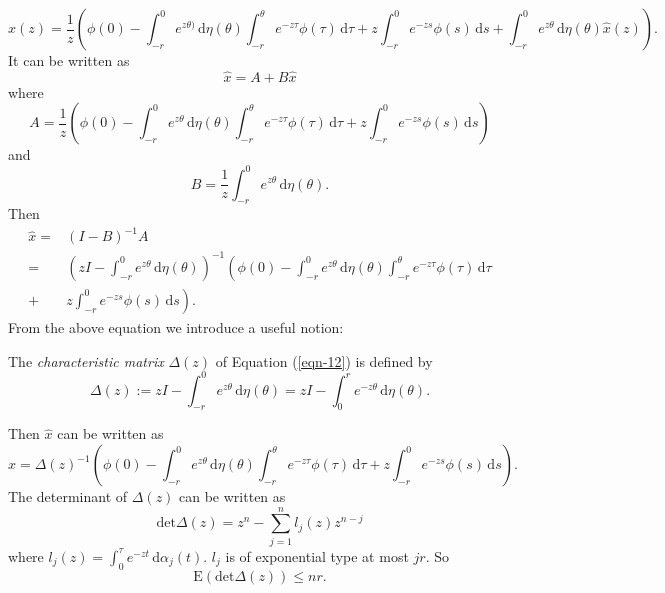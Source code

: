 \begin{equation*}
  \widehat{x}(z)= \frac{1}{z}\left( \phi(0)-\int_{-r}^{0}e^{z\theta)}\,\mathrm{d}\eta(\theta)\int_{-r}^{\theta}e^{-z\tau }\phi(\tau )\,\mathrm{d}\tau +z\int_{-r}^{0}e^{-zs}\phi(s)\,\mathrm{d}s+\int_{-r}^{0}e^{z\theta}\,\mathrm{d}\eta(\theta)\widehat{x}(z) \right) .
\end{equation*}
It can be written as 
\[
\widehat{x}=A+B\widehat{x}
\] 
where
\[
  A=\frac{1}{z}\left( \phi(0)-\int_{-r}^{0}e^{z\theta}\,\mathrm{d}\eta(\theta)\int_{-r}^{\theta}e^{-z\tau }\phi(\tau )\,\mathrm{d}\tau +z\int_{-r}^{0}e^{-zs}\phi(s)\,\mathrm{d}s \right) 
\] 
and
\[
  B=\frac{1}{z}\int_{-r}^{0}e^{z\theta}\,\mathrm{d}\eta(\theta).
\] 
Then
\begin{equation}\label{eqn-17}
 \begin{aligned}
    \widehat{x}= & (I-B)^{-1}A\\
    = & \left(zI-\int_{-r}^{0}e^{z\theta}\,\mathrm{d}\eta(\theta)\right)^{-1} \left( \phi(0)-\int_{-r}^{0}e^{z\theta}\,\mathrm{d}\eta(\theta)\int_{-r}^{\theta}e^{-z\tau }\phi(\tau )\,\mathrm{d}\tau  \right.\\
  + &\left. z\int_{-r}^{0}e^{-zs}\phi(s)\,\mathrm{d}s\right).
  \end{aligned}
\end{equation}
From the above equation we introduce a useful notion:
\begin{definition}
  The \textit{characteristic matrix} $\Delta(z)$ of Equation (\ref{eqn-12}) is defined by
  \begin{equation}
    \Delta(z):=zI-\int_{-r}^{0}e^{z\theta}\,\mathrm{d}\eta(\theta)=zI-\int_0^{r}e^{-z\theta}\,\mathrm{d}\eta(\theta).
  \end{equation}
\end{definition}
Then $\widehat{x}$ can be written as 
\begin{equation}\label{eqn-19}
  \widehat{x}=\Delta(z)^{-1}\left( \phi(0)-\int_{-r}^{0}e^{z\theta}\,\mathrm{d}\eta(\theta)\int_{-r}^{\theta}e^{-z\tau }\phi(\tau )\,\mathrm{d}\tau +z\int_{-r}^{0}e^{-zs}\phi(s)\,\mathrm{d}s \right). 
\end{equation}
The determinant of $\Delta(z)$ can be written as 
\[
  \mathrm{det}\Delta(z)=z^{n}-\sum_{j=1}^{n} l_j(z)z^{n-j}
\] 
where $l_j(z)=\int_0^{\tau }e^{-zt }\,\mathrm{d}\alpha_j(t)$. $l_j$ is of exponential type at most $jr$. So 
\begin{equation}\label{eqn-20}
  \mathrm{E}\left( \mathrm{det}\Delta(z) \right) \le nr.
\end{equation}
